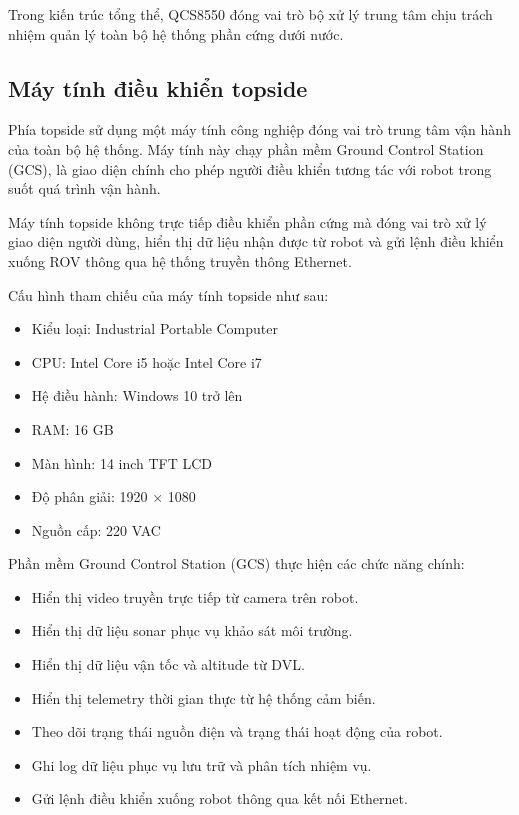 \documentclass[../DoAn.tex]{subfiles}
\begin{document}
Trong kiến trúc tổng thể, QCS8550 đóng vai trò bộ xử lý trung tâm chịu trách nhiệm quản lý toàn bộ hệ thống phần cứng dưới nước.

\subsection{Máy tính điều khiển topside}

Phía topside sử dụng một máy tính công nghiệp đóng vai trò trung tâm vận hành của toàn bộ hệ thống. Máy tính này chạy phần mềm Ground Control Station (GCS), là giao diện chính cho phép người điều khiển tương tác với robot trong suốt quá trình vận hành.

Máy tính topside không trực tiếp điều khiển phần cứng mà đóng vai trò xử lý giao diện người dùng, hiển thị dữ liệu nhận được từ robot và gửi lệnh điều khiển xuống ROV thông qua hệ thống truyền thông Ethernet.

Cấu hình tham chiếu của máy tính topside như sau:

\begin{itemize}
    \item Kiểu loại: Industrial Portable Computer
    \item CPU: Intel Core i5 hoặc Intel Core i7
    \item Hệ điều hành: Windows 10 trở lên
    \item RAM: 16 GB
    \item Màn hình: 14 inch TFT LCD
    \item Độ phân giải: 1920 × 1080
    \item Nguồn cấp: 220 VAC
\end{itemize}

Phần mềm Ground Control Station (GCS) thực hiện các chức năng chính:

\begin{itemize}
    \item Hiển thị video truyền trực tiếp từ camera trên robot.
    \item Hiển thị dữ liệu sonar phục vụ khảo sát môi trường.
    \item Hiển thị dữ liệu vận tốc và altitude từ DVL.
    \item Hiển thị telemetry thời gian thực từ hệ thống cảm biến.
    \item Theo dõi trạng thái nguồn điện và trạng thái hoạt động của robot.
    \item Ghi log dữ liệu phục vụ lưu trữ và phân tích nhiệm vụ.
    \item Gửi lệnh điều khiển xuống robot thông qua kết nối Ethernet.
\end{itemize}
\end{document}
